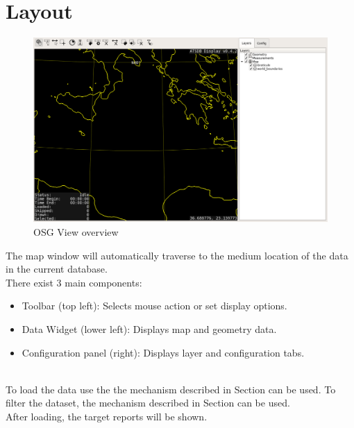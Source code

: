 \section{Layout}

\begin{figure}[H]
    \hspace*{-2cm}
    \includegraphics[width=18cm,frame]{../screenshots/osgview_overview.png}
  \caption{OSG View overview}
  \label{fig:osgview_overview}
\end{figure}

The map window will automatically traverse to the medium location of the data in the current database. \\

There exist 3 main components:
\begin{itemize}
 \item Toolbar (top left): Selects mouse action or set display options.
 \item Data Widget (lower left): Displays map and geometry data.
 \item Configuration panel (right): Displays layer and configuration tabs.
\end{itemize}
\ \\

To load the data use the the mechanism described in Section  can be used. To filter the dataset, the mechanism described in Section  can be used. \\

After loading, the target reports will be shown.

